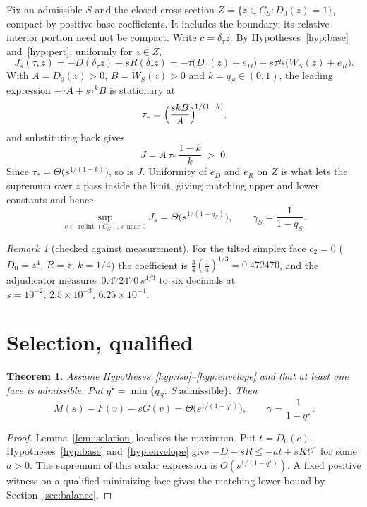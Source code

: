 \documentclass[11pt]{article}
\newtheorem{theorem}{Theorem}
\theoremstyle{definition}
\theoremstyle{remark}
\newtheorem{remark}{Remark}
\DeclareMathOperator{\relint}{relint}
\begin{document}
Fix an admissible $S$ and the closed cross-section
$Z=\{z\in C_S:D_0(z)=1\}$, compact by positive base coefficients.
It includes the boundary; its relative-interior portion need not be compact. Write
$c=\delta_\tau z$. By Hypotheses~\ref{hyp:base} and~\ref{hyp:pert}, uniformly
for $z\in Z$,
\[
  J_s(\tau,z)=-D(\delta_\tau z)+sR(\delta_\tau z)
  =-\tau\bigl(D_0(z)+e_D\bigr)+s\tau^{q_S}\bigl(W_S(z)+e_R\bigr).
\]
With $A=D_0(z)>0$, $B=W_S(z)>0$ and $k=q_S\in(0,1)$, the leading expression
$-\tau A+s\tau^{k}B$ is stationary at
\[
  \tau_\ast=\Bigl(\frac{skB}{A}\Bigr)^{\!1/(1-k)},
\]
and substituting back gives
\[
  J=A\,\tau_\ast\,\frac{1-k}{k}\;>\;0 .
\]
Since $\tau_\ast=\Theta\bigl(s^{1/(1-k)}\bigr)$, so is $J$. Uniformity of
$e_D$ and $e_R$ on $Z$ is what lets the supremum over $z$ pass inside the
limit, giving matching upper and lower constants and hence
\[
  \sup_{c\in\relint(C_S),\ c\text{ near }0}J_s=\Theta\bigl(s^{1/(1-q_S)}\bigr),
  \qquad
  \gamma_S=\frac{1}{1-q_S}.
\]

\begin{remark}[checked against measurement]
For the tilted simplex face $c_2=0$ ($D_0=z^4$, $R=z$, $k=1/4$) the
coefficient is $\tfrac34(\tfrac14)^{1/3}=0.472470$, and the adjudicator
measures $0.472470\,s^{4/3}$ to six decimals at
$s=10^{-2},\,2.5\times10^{-3},\,6.25\times10^{-4}$.
\end{remark}

\section{Selection, qualified}\label{sec:selection}

\begin{theorem}\label{thm:selection}
Assume Hypotheses~\ref{hyp:iso}--\ref{hyp:envelope} and that at least one face
is admissible. Put $q^\star=\min\{q_S:\ S\ \text{admissible}\}$. Then
\[
  M(s)-F(v)-sG(v)=\Theta\bigl(s^{1/(1-q^\star)}\bigr),
  \qquad
  \gamma=\frac{1}{1-q^\star}.
\]
\end{theorem}

\begin{proof}
Lemma~\ref{lem:isolation} localises the maximum. Put $t=D_0(c)$.
Hypotheses~\ref{hyp:base} and~\ref{hyp:envelope} give
$-D+sR\le-at+sKt^{q^\star}$ for some $a>0$. The supremum of this scalar
expression is $O(s^{1/(1-q^\star)})$. A fixed positive witness on a
qualified minimizing face gives the matching lower bound by
Section~\ref{sec:balance}.
\end{proof}
\end{document}
